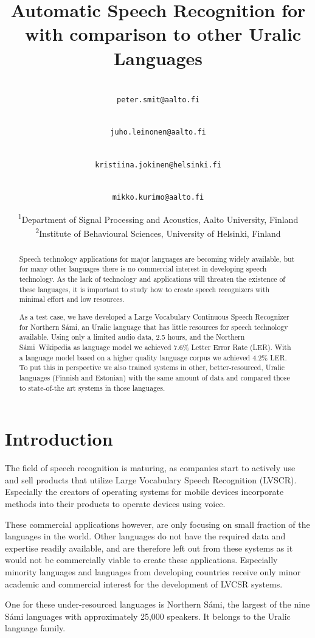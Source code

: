 \documentclass[b5paper]{article}
\title{Automatic Speech Recognition for \ns\ with comparison to other Uralic Languages\blfootnote{
    This work is licensed under a Creative Commons Attribution–NoDerivatives
    4.0 International Licence.  Licence details:
    \url{http://creativecommons.org/licenses/by-nd/4.0/}
}}
\author{
\makebox[.45\linewidth]{Peter Smit\textsuperscript{1}}\\
\texttt{peter.smit@aalto.fi}
\\
\and 
\makebox[.45\linewidth]{Juho Leinonen\textsuperscript{1}}\\
\texttt{juho.leinonen@aalto.fi}
\\
\and 
\makebox[.45\linewidth]{Kristiina Jokinen\textsuperscript{2}}\\
\texttt{kristiina.jokinen@helsinki.fi}
\and
\makebox[.45\linewidth]{Mikko Kurimo\textsuperscript{1}}\\ 
\texttt{mikko.kurimo@aalto.fi}
\\ 
\and
\small\textsuperscript{1}Department of Signal Processing and Acoustics, Aalto University, Finland \\
\small\textsuperscript{2}Institute of Behavioural Sciences, University of Helsinki, Finland\\
}
\newcommand{\ns}{Northern Sámi}
\begin{document}
\maketitle

\begin{abstract} 
Speech technology applications for major languages are becoming widely available, but for many other languages there is no commercial interest in developing speech technology. As the lack of technology and applications will threaten the existence of these languages, it is important to study how to create speech recognizers with minimal effort and low resources.

As a test case, we have developed a Large Vocabulary Continuous Speech Recognizer for \ns, an Uralic language that has little resources for speech technology available. Using only a limited audio data, 2.5 hours, and the \ns\ Wikipedia as language model we achieved 7.6\% Letter Error Rate (LER). With a language model based on a higher quality language corpus we achieved 4.2\% LER. To put this in perspective we also trained systems in other, better-resourced, Uralic languages (Finnish and Estonian) with the same amount of data and compared those to state-of-the art systems in those languages. 
\end{abstract}

\section{Introduction}

The field of speech recognition is maturing, as companies start to actively use and sell products that utilize Large Vocabulary Speech Recognition (LVSCR). Especially the creators of operating systems for mobile devices incorporate methods into their products to operate devices using voice.

These commercial applications however, are only focusing on small fraction of the languages in the world. Other languages do not have the required data and expertise readily available, and are therefore left out from these systems as it would not be commercially viable to create these applications. Especially minority languages and languages from developing countries receive only minor academic and commercial interest for the development of LVCSR systems. \cite{besacier2014automatic}

One for these under-resourced languages is \ns, the largest of the nine Sámi languages with approximately 25,000 speakers. It belongs to the Uralic language family. \cite{ethno18}
\end{document}
